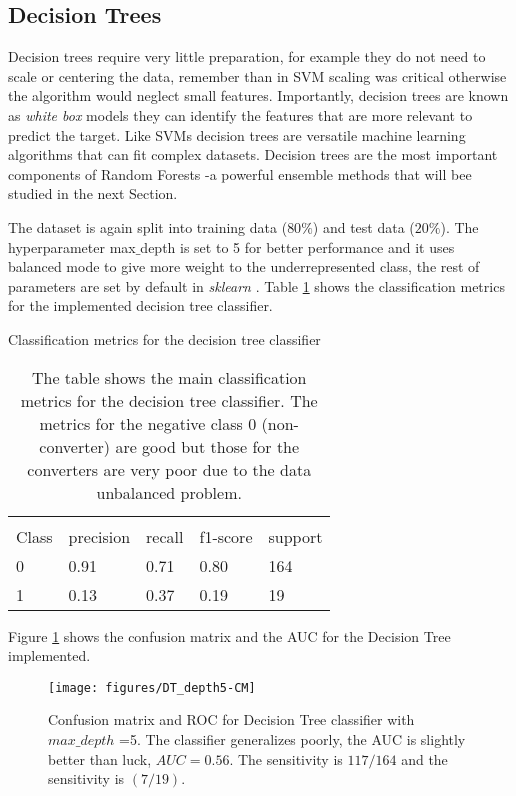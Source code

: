 \documentclass[11pt]{article}
\theoremstyle{definition}
\theoremstyle{remark}
\begin{document}
\subsection{Decision Trees}
\label{sse:resdectrees}
Decision trees require very little preparation, for example they do not need to scale or centering the data, remember than in SVM scaling was critical otherwise the algorithm would neglect small features.
Importantly, decision trees are known as \emph{white box} models they can identify the features that are more relevant to predict the target.
Like SVMs decision trees are versatile machine learning algorithms that can fit complex datasets. Decision trees are the most important components of Random Forests -a powerful ensemble methods that will bee studied in the next Section.

The dataset is again split into training data ($80\%$) and test data ($20\%$). The hyperparameter max$\_$depth is set to 5 for better performance and it uses balanced mode to give more weight to the underrepresented class, the rest of parameters are set by default in \emph{sklearn} \cite{scikit-learn}. Table \ref{tab:dectree} shows the classification metrics for the implemented decision tree classifier.

\begin{table}[H]
\caption{Classification metrics for the decision tree classifier}
\begin{center} 
\begin{tabular}{lllll}
\hline
\multicolumn{1}{c}{} \\
Class & precision & recall & f1-score & support     \\
\hline
0 & 0.91 &  0.71  &  0.80  & 164 \\
1 & 0.13 &  0.37  &  0.19  & 19  \\
\hline
\end{tabular}
\caption{The table shows the main classification metrics for the decision tree classifier. The metrics for the negative class 0 (non-converter) are good but those for the converters are very poor due to the data unbalanced problem.  
}  \label{tab:dectree} 
\end{center}
\end{table}


Figure \ref{fig:dt-md5} shows the confusion matrix and the AUC for the Decision Tree implemented. 
\begin{figure}[H]
        \centering
        \texttt{[image: figures/DT\_depth5-CM]}
        \caption{Confusion matrix and ROC for Decision Tree classifier with $max\_depth$ =5. The classifier generalizes poorly, the AUC is slightly better than luck, $AUC=0.56$. The sensitivity is $117/164$ and the sensitivity is $(7/19)$.
        } \label{fig:dt-md5}
\end{figure}
\end{document}
